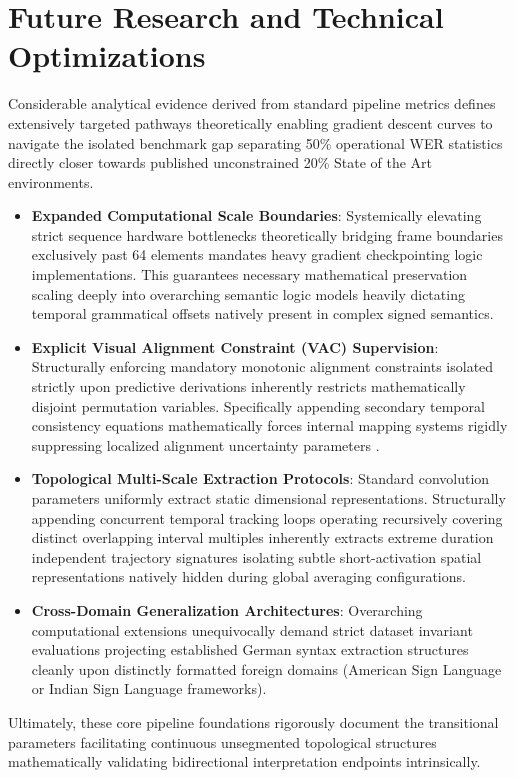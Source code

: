 \section{Future Research and Technical Optimizations}

Considerable analytical evidence derived from standard pipeline metrics defines extensively targeted pathways theoretically enabling gradient descent curves to navigate the isolated benchmark gap separating 50\% operational WER statistics directly closer towards published unconstrained 20\% State of the Art environments.

\begin{itemize}
    \item \textbf{Expanded Computational Scale Boundaries}: Systemically elevating strict sequence hardware bottlenecks theoretically bridging frame boundaries exclusively past 64 elements mandates heavy gradient checkpointing logic implementations. This guarantees necessary mathematical preservation scaling deeply into overarching semantic logic models heavily dictating temporal grammatical offsets natively present in complex signed semantics.
    \item \textbf{Explicit Visual Alignment Constraint (VAC) Supervision}: Structurally enforcing mandatory monotonic alignment constraints isolated strictly upon predictive derivations inherently restricts mathematically disjoint permutation variables. Specifically appending secondary temporal consistency equations mathematically forces internal mapping systems rigidly suppressing localized alignment uncertainty parameters \cite{zhu2021visual}.
    \item \textbf{Topological Multi-Scale Extraction Protocols}: Standard convolution parameters uniformly extract static dimensional representations. Structurally appending concurrent temporal tracking loops operating recursively covering distinct overlapping interval multiples inherently extracts extreme duration independent trajectory signatures isolating subtle short-activation spatial representations natively hidden during global averaging configurations. 
    \item \textbf{Cross-Domain Generalization Architectures}: Overarching computational extensions unequivocally demand strict dataset invariant evaluations projecting established German syntax extraction structures cleanly upon distinctly formatted foreign domains (American Sign Language or Indian Sign Language frameworks).
\end{itemize}

Ultimately, these core pipeline foundations rigorously document the transitional parameters facilitating continuous unsegmented topological structures mathematically validating bidirectional interpretation endpoints intrinsically.
